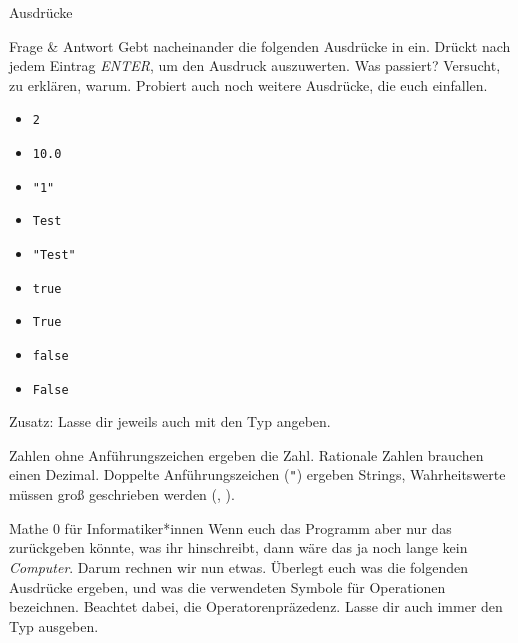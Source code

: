 \begin{task}[points=auto]{Ausdrücke }
    \begin{subtask*}[points=0]{Frage \& Antwort}
        Gebt nacheinander die folgenden Ausdrücke in  ein.
        Drückt nach jedem Eintrag \textit{ENTER}, um den Ausdruck auszuwerten.
        Was passiert? Versucht, zu erklären, warum.
        Probiert auch noch weitere Ausdrücke,
        die euch einfallen.

        \begin{multicols}{3}
            \begin{itemize}
                \item \texttt{2}
                \item \texttt{10.0}
                \item \texttt{"1"}
                \item \texttt{Test}
                \item \texttt{"Test"}
                \item \texttt{true}
                \item \texttt{True}
                \item \texttt{false}
                \item \texttt{False}
            \end{itemize}
        \end{multicols}

        Zusatz: Lasse dir jeweils auch mit  den Typ angeben.

        \begin{solution}
            Zahlen ohne Anführungszeichen ergeben die Zahl. Rationale Zahlen brauchen einen
            Dezimal.
            Doppelte Anführungszeichen (\texttt{"}) ergeben Strings,
            Wahrheitswerte müssen groß geschrieben werden (,
            ).
        \end{solution}
    \end{subtask*}
    \begin{subtask*}[points=0]{Mathe 0 für Informatiker*innen}
        Wenn euch das Programm aber nur das zurückgeben könnte, was ihr hinschreibt,
        dann wäre das ja noch lange kein \textit{Computer}. Darum rechnen wir nun etwas.
        Überlegt euch was die folgenden Ausdrücke ergeben, und was die verwendeten
        Symbole für Operationen bezeichnen.
        Beachtet dabei, die Operatorenpräzedenz.
        Lasse dir auch immer den Typ ausgeben.


\end{subtask*}
\end{task}
